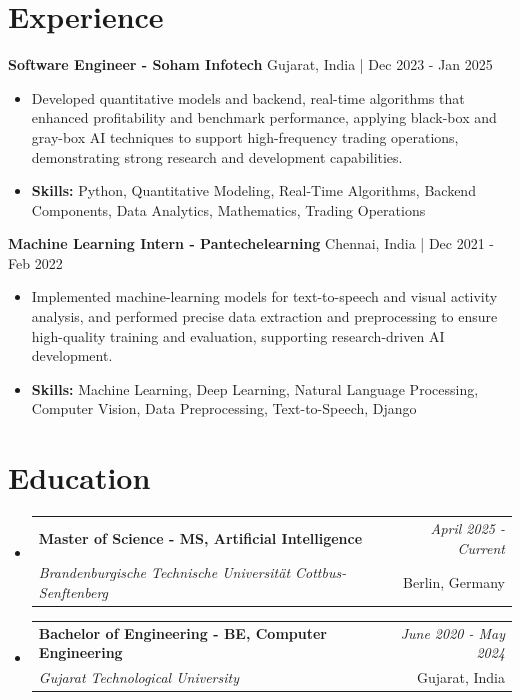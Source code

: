 \documentclass[a4paper,11pt]{article}
\makeatletter
\newcommand{\resumeSubheading}[4]{
\vspace{0.5mm}\item
    \begin{tabular*}{0.98\textwidth}[t]{l@{\extracolsep{\fill}}r}
        \textbf{#1} & \textit{\footnotesize{#4}} \\
        \textit{\footnotesize{#3}} &  \footnotesize{#2}\\
    \end{tabular*}
    \vspace{-2.4mm}
}
\makeatother
\begin{document}
\section{\textbf{Experience}}


\vspace{1mm}
  \textbf{Software Engineer - Soham Infotech} \hfill Gujarat, India | Dec 2023 - Jan 2025
\vspace{-1.5mm} %
\begin{itemize}
  \item Developed quantitative models and backend, real-time algorithms that enhanced profitability and benchmark performance, applying black-box and gray-box AI techniques to support high-frequency trading operations, demonstrating strong research and development capabilities.

\vspace{-2mm}
  \item \textbf{Skills:} Python, Quantitative Modeling, Real-Time Algorithms, Backend Components, Data Analytics, Mathematics, Trading Operations
\end{itemize}

\vspace{1mm}
  \textbf{Machine Learning Intern - Pantechelearning} \hfill Chennai, India | Dec 2021 - Feb 2022
\vspace{-1.5mm} %
\begin{itemize}
  \item Implemented machine-learning models for text-to-speech and visual activity analysis, and performed precise data extraction and preprocessing to ensure high-quality training and evaluation, supporting research-driven AI development.
\vspace{-2mm}
  \item \textbf{Skills:} Machine Learning, Deep Learning, Natural Language Processing, Computer Vision, Data Preprocessing, Text-to-Speech, Django
\end{itemize}\section{\textbf{Education}}
\vspace{-0.4mm}

\begin{itemize}
\resumeSubheading
{Master of Science - MS, Artificial Intelligence }{Berlin, Germany}
{Brandenburgische Technische Universität Cottbus-Senftenberg  }{April 2025 - Current}

\vspace{1.0mm} %
\resumeSubheading
{Bachelor of Engineering - BE, Computer Engineering  }{Gujarat, India}
{Gujarat Technological University }{June 2020 - May 2024}

\end{itemize}
\end{document}
